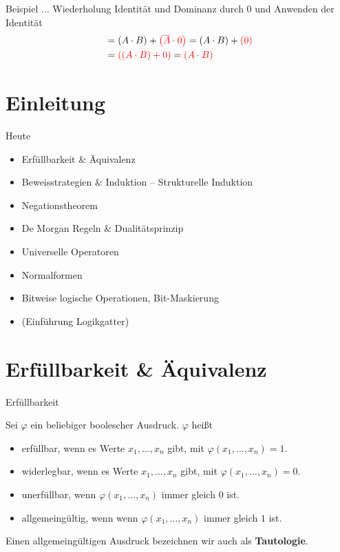 \documentclass[12pt%
,aspectratio=169%
]{beamer}
\begin{document}
\begin{frame}{Beispiel}
... Wiederholung Identität und Dominanz durch $0$ und Anwenden der Identität
\begin{align*}
&= \left(A \cdot B\right) + \textcolor{red}{\left(\overline{A} \cdot 0\right)} = \left(A \cdot B\right) + \textcolor{red}{\left(0\right)}\\
&= \textcolor{red}{\left(\left(A \cdot B\right) + 0\right)} = \textcolor{red}{\left(A \cdot B\right)}
\end{align*}
\end{frame}


\section{Einleitung}
\begin{frame}{Heute}
\begin{itemize}
	\item Erfüllbarkeit \& Äquivalenz
	\item Beweisstrategien \& Induktion -- Strukturelle Induktion
	\item Negationstheorem
	\item De Morgan Regeln \& Dualitätsprinzip
	\item Universelle Operatoren
	\item Normalformen
	\item Bitweise logische Operationen, Bit-Maskierung
	\item (Einführung Logikgatter)
\end{itemize}
\end{frame}

\section{Erfüllbarkeit \& Äquivalenz}
\begin{frame}{Erfüllbarkeit}
	\begin{definition}[Erfüllbarkeit]
		Sei $\varphi$ ein beliebiger boolescher Ausdruck. $\varphi$ heißt
		\begin{itemize}
			\item erfüllbar, wenn es Werte $x_1, \ldots, x_n$ gibt, mit $\varphi (x_1, \ldots, x_n ) = 1$.
			\item widerlegbar, wenn es Werte $x_1, \ldots, x_n$ gibt, mit $\varphi (x_1, \ldots, x_n) = 0$.
			\item unerfüllbar, wenn $\varphi (x_1 ,\ldots , x_n )$ immer gleich $0$ ist.
			\item allgemeingültig, wenn wenn $\varphi (x_1 ,\ldots , x_n )$ immer gleich $1$ ist.
		\end{itemize}
		Einen allgemeingültigen Ausdruck bezeichnen wir auch als \textbf{Tautologie}.
	\end{definition}
\end{frame}
\end{document}
